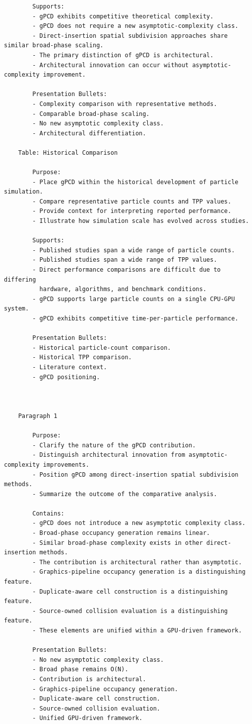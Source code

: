 \begin{verbatim}
		Supports:
		- gPCD exhibits competitive theoretical complexity.
		- gPCD does not require a new asymptotic-complexity class.
		- Direct-insertion spatial subdivision approaches share similar broad-phase scaling.
		- The primary distinction of gPCD is architectural.
		- Architectural innovation can occur without asymptotic-complexity improvement.

		Presentation Bullets:
		- Complexity comparison with representative methods.
		- Comparable broad-phase scaling.
		- No new asymptotic complexity class.
		- Architectural differentiation.

	Table: Historical Comparison

		Purpose:
		- Place gPCD within the historical development of particle simulation.
		- Compare representative particle counts and TPP values.
		- Provide context for interpreting reported performance.
		- Illustrate how simulation scale has evolved across studies.

		Supports:
		- Published studies span a wide range of particle counts.
		- Published studies span a wide range of TPP values.
		- Direct performance comparisons are difficult due to differing
		  hardware, algorithms, and benchmark conditions.
		- gPCD supports large particle counts on a single CPU-GPU system.
		- gPCD exhibits competitive time-per-particle performance.

		Presentation Bullets:
		- Historical particle-count comparison.
		- Historical TPP comparison.
		- Literature context.
		- gPCD positioning.

	

	Paragraph 1

		Purpose:
		- Clarify the nature of the gPCD contribution.
		- Distinguish architectural innovation from asymptotic-complexity improvements.
		- Position gPCD among direct-insertion spatial subdivision methods.
		- Summarize the outcome of the comparative analysis.

		Contains:
		- gPCD does not introduce a new asymptotic complexity class.
		- Broad-phase occupancy generation remains linear.
		- Similar broad-phase complexity exists in other direct-insertion methods.
		- The contribution is architectural rather than asymptotic.
		- Graphics-pipeline occupancy generation is a distinguishing feature.
		- Duplicate-aware cell construction is a distinguishing feature.
		- Source-owned collision evaluation is a distinguishing feature.
		- These elements are unified within a GPU-driven framework.

		Presentation Bullets:
		- No new asymptotic complexity class.
		- Broad phase remains O(N).
		- Contribution is architectural.
		- Graphics-pipeline occupancy generation.
		- Duplicate-aware cell construction.
		- Source-owned collision evaluation.
		- Unified GPU-driven framework.



\end{verbatim}
